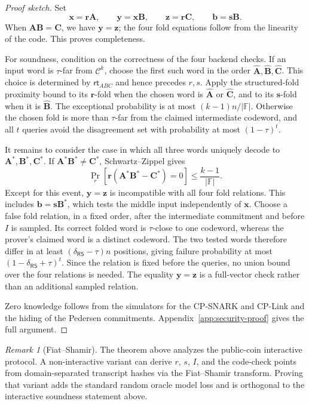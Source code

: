 \documentclass[conference,compsoc]{IEEEtran}
\newif\ifshowrevisions
\newenvironment{revblock}[1][]
  {%
    \ifshowrevisions
      \begin{tcolorbox}[
        breakable,
        colback=revisionyellow,
        colframe=revisionyellow,
        boxrule=0pt,
        arc=0pt,
        left=2pt,
        right=2pt,
        top=2pt,
        bottom=2pt,
        before skip=2pt,
        after skip=2pt,
        #1
      ]
    \fi
  }
  {%
    \ifshowrevisions
      \end{tcolorbox}
    \fi
  }
\newcommand{\rt}{\textsf{rt}}
\newcommand{\mat}{\mathbf}          %
\newcommand{\vect}{\mathbf}         %
\theoremstyle{plain}
\theoremstyle{definition}
\theoremstyle{remark}
\newtheorem{remark}{Remark}
\begin{document}
\begin{revblock}
\begin{proof}[Proof sketch]
Set
\[
  \vect x=\vect r\mat A,\qquad
  \vect y=\vect x\mat B,\qquad
  \vect z=\vect r\mat C,\qquad
  \vect b=\vect s\mat B.
\]
When \(\mat A\mat B=\mat C\), we have \(\vect y=\vect z\); the four fold
equations follow from the linearity of the code.  This proves completeness.

For soundness, condition on the correctness of the four backend checks.  If an
input word is \(\tau\)-far from \(\mathcal C^k\), choose the first such word in
the order \(\widehat{\mat A},\widehat{\mat B},\widehat{\mat C}\).  This choice
is determined by \(\rt_{ABC}\) and hence precedes \(r,s\).  Apply the
structured-fold proximity bound to its \(\vect r\)-fold when the chosen word is
\(\widehat{\mat A}\) or \(\widehat{\mat C}\), and to its \(\vect s\)-fold when
it is \(\widehat{\mat B}\).  The exceptional probability is at most
\((k-1)n/|\mathbb F|\).  Otherwise the chosen fold is more than \(\tau\)-far
from the claimed intermediate codeword, and all \(t\) queries avoid the
disagreement set with probability at most \((1-\tau)^t\).

It remains to consider the case in which all three words uniquely decode to
\(\mat A^*,\mat B^*,\mat C^*\).  If
\(\mat A^*\mat B^*\ne\mat C^*\), Schwartz--Zippel gives
\[
 \Pr_r[\vect r(\mat A^*\mat B^*-\mat C^*)=0]
 \le\frac{k-1}{|\mathbb F|}.
\]
Except for this event, \(\vect y=\vect z\) is incompatible with all four fold
relations.  This includes \(\vect b=\vect s\mat B^*\), which tests the middle
input independently of \(\vect x\).  Choose a false fold relation, in a fixed
order, after the intermediate commitment and before \(I\) is sampled.  Its
correct folded word is \(\tau\)-close to one codeword, whereas the prover's
claimed word is a distinct codeword.  The two tested words therefore differ
in at least \((\delta_{\mathsf{RS}}-\tau)n\) positions, giving failure
probability at most \((1-\delta_{\mathsf{RS}}+\tau)^t\).  Since the relation is
fixed before the queries, no union bound over the four relations is needed.
The equality \(\vect y=\vect z\) is a full-vector check rather than an
additional sampled relation.

Zero knowledge follows from the simulators for the CP-SNARK and CP-Link and the
hiding of the Pedersen commitments.  Appendix~\ref{app:security-proof} gives
the full argument.
\end{proof}

\begin{remark}[Fiat--Shamir]
The theorem above analyzes the public-coin interactive protocol.  A
non-interactive variant can derive \(r\), \ensuremath{s}, \(I\), and the code-check points from
domain-separated transcript hashes via the Fiat--Shamir transform.  Proving
that variant adds the standard random oracle model loss and is orthogonal to
the interactive soundness statement above.
\end{remark}
\end{revblock}
\end{document}
